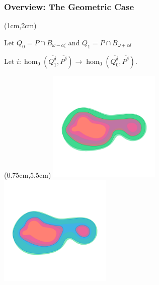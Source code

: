 \begin{frame}
  \frametitle{Overview: The Geometric Case}
  \begin{textblock*}{11cm}(1cm,2cm)
  \begin{small}
    Let $Q_0 = P\cap B_{\omega-c\zeta}$ and $Q_1 = P\cap B_{\omega+c\delta}$\vspace{1ex}

    Let $i : \hom_0(\overline{Q_1^\delta}, \overline{P^\delta})\to \hom_0(\overline{Q_0^\delta}, \overline{P^\delta})$.

  \end{small}
  \end{textblock*}

  \begin{textblock*}{12cm}(0.75cm,5.5cm)
    \includegraphics[trim=50 250 50 300, clip, width=0.4\textwidth]{figures/nbhd/PQ0}\hspace{6ex}%
    \includegraphics[trim=50 250 50 300, clip, width=0.4\textwidth]{figures/nbhd/PQ1}
  \end{textblock*}
\end{frame}


